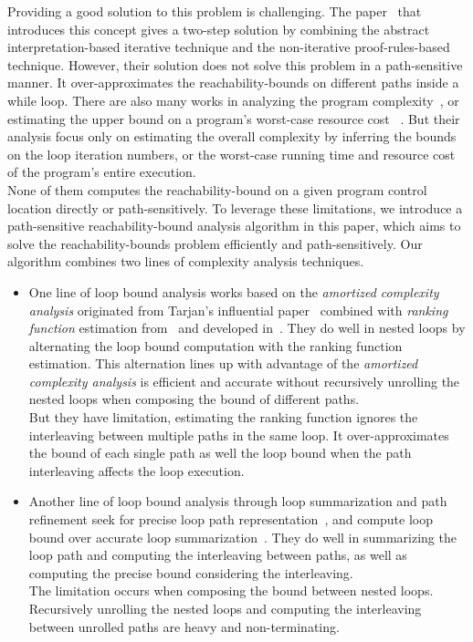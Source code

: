 Providing a good solution to this problem is challenging.
The paper~\cite{GulwaniZ10} that introduces this concept
gives a two-step solution by combining the abstract interpretation-based iterative technique
and the non-iterative proof-rules-based technique.
However, their solution
does not solve this problem in a path-sensitive manner.
It over-approximates the reachability-bounds on different paths inside a while loop.
There are also many works in analyzing the program complexity~\cite{GustafssonEL05,HumenbergerJK18},
or estimating the upper bound on a program's worst-case resource cost
~\cite{BrockschmidtEFFG16,AlbertAGP08,AliasDFG10,Flores-MontoyaH14}.
But their analysis
focus only on estimating 
the overall complexity 
by inferring the bounds on the loop iteration numbers,
or the worst-case running time and resource cost of the program's entire execution.
\\
None of them computes the reachability-bound on a given program control location directly or path-sensitively.
To leverage these limitations,
we introduce a path-sensitive reachability-bound analysis algorithm in this paper, which aims to solve 
the reachability-bounds problem efficiently and path-sensitively.
Our algorithm combines two lines of complexity analysis techniques.
\begin{itemize}
  \item One line of loop bound analysis works based on the \emph{amortized complexity analysis} originated from Tarjan's influential paper~\cite{PotechinP17} combined with \emph{ranking function} estimation from~\cite{BradleyMS05} and developed in~\cite{ZulegerGSV11,SinnZV14,SinnZV17,LuCT21,AliasDFG10}.
  They do well in nested loops by alternating the loop bound computation with the ranking function estimation. This alternation lines up with advantage of the \emph{amortized complexity analysis} is efficient and accurate without recursively unrolling the nested loops when composing the bound of different paths.
  \\
  But they have limitation, estimating the ranking function ignores the interleaving between multiple paths in the same loop.
  It over-approximates the bound of each single path as well the loop bound when the path interleaving affects the loop execution.
  \item 
  Another line of loop bound analysis through loop summarization and path refinement seek for precise loop path representation~\cite{ManoliosV06,BalakrishnanSIG09,SharmaDDA11,Flores-MontoyaH14,HumenbergerJK18,CyphertBKR19}, and compute loop bound over accurate loop summarization~\cite{GulwaniJK09,ZulegerGSV11}.
  They do well in summarizing the loop path and computing the interleaving between paths, as well as computing the precise bound considering the interleaving.
  \\
  The limitation occurs when composing the bound between nested loops. Recursively unrolling the nested loops and computing the interleaving between unrolled paths are heavy and non-terminating.
\end{itemize}
